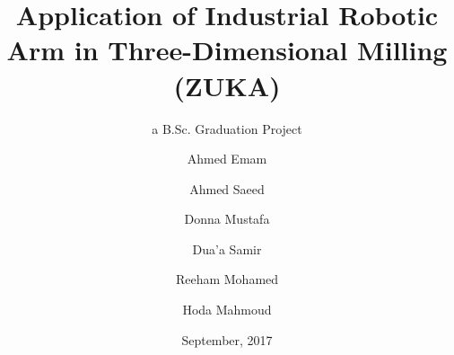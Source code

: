 \titlehead{\centering\texttt{[image: myFrontMatter/figures/zuLogo]}
    \texttt{[image: myFrontMatter/figures/engLogo]}}

\subject{Zagazig University, Faculty of Engineering, Mechatronics Program}

\title{Application of Industrial Robotic Arm in Three-Dimensional Milling\\
    (ZUKA)}

\subtitle{a B.Sc. Graduation Project}
\author{
Ahmed Emam
\and{Ahmed Saeed}
\and{Donna Mustafa}
\and{Dua’a Samir}
\and{Reeham Mohamed}
\and{Hoda Mahmoud}}



\publishers{Submitted to The Mechatronics Program, Faculty of Engineering, Zagazig University, Egypt}
\date{September, 2017}

\uppertitleback{Graduation Project Report to be submitted to\\
Zagazig University, faculty of Engineering\\
in partial fulfillment of the requirements for the degree \\
Bachelor of Science in Engineering (B.Sc.)\\
}



\lowertitleback{\textbf{Date of Presentation}\\
  24. Juni 2015\\~\\
  
  \textbf{Supervisors}\\
Dr.Ing. \textbf{Mohammed Nour Abdel Gwad Ahmed}\\
\footnotesize{\itshape 
 Computer and Systems Engineering Department,\\
  Faculty of Engineering, Zagazig University, Egypt}\\~\\
Dr. \textbf{Ahmed Hamdy Hassanien}\\
\footnotesize{\itshape ~~ Mechanical Engineering Department, \\
    Faculty of Engineering, Zagazig University, Egypt}\\

\textbf{Defense Commete}\\
Prof. Dr. Xyz Wuv\\
Prof. Dr. Abc Def}